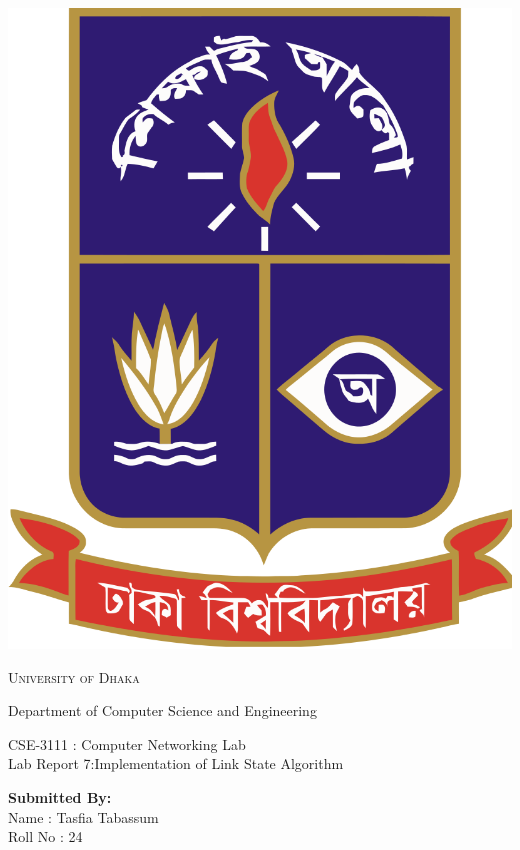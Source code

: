 \documentclass[11pt]{article}
\begin{document}
\begin{titlepage}
	\begin{center}
    	\includegraphics[scale=0.10]{du.png}\par
		\begin{Huge}
			\textsc{University of Dhaka}\par
		\end{Huge}
		\begin{Large}
			Department of Computer Science and Engineering\par \vspace{.5cm}
			CSE-3111 : Computer Networking Lab \\[12pt]	
			Lab Report 7:Implementation of Link State Algorithm
		\end{Large}
	\end{center}  	
	\begin{large}
		\textbf{Submitted By:\\[12pt]}
			Name : Tasfia Tabassum\\[8pt]
			Roll No : 24\\[12pt]

\end{large}
\end{titlepage}
\end{document}
